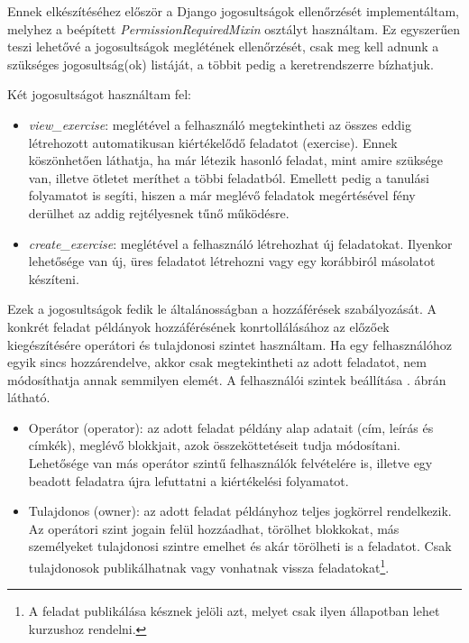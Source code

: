 Ennek elkészítéséhez először a Django jogosultságok ellenőrzését implementáltam, melyhez a beépített \textit{PermissionRequiredMixin} osztályt használtam. Ez egyszerűen teszi lehetővé a jogosultságok meglétének ellenőrzését, csak meg kell adnunk a szükséges jogosultság(ok) listáját, a többit pedig a keretrendszerre bízhatjuk. \cite{DjangoPermissionMixin}

Két jogosultságot használtam fel:

\begin{itemize}
    \item \textit{view\_exercise}: meglétével a felhasználó megtekintheti az összes eddig létrehozott automatikusan kiértékelődő feladatot (exercise). Ennek köszönhetően láthatja, ha már létezik hasonló feladat, mint amire szüksége van, illetve ötletet meríthet a többi feladatból. Emellett pedig a tanulási folyamatot is segíti, hiszen a már meglévő feladatok megértésével fény derülhet az addig rejtélyesnek tűnő működésre.
    \item \textit{create\_exercise}: meglétével a felhasználó létrehozhat új feladatokat. Ilyenkor lehetősége van új, üres feladatot létrehozni vagy egy korábbiról másolatot készíteni.
\end{itemize}

Ezek a jogosultságok fedik le általánosságban a hozzáférések szabályozását. A konkrét feladat példányok hozzáférésének konrtollálásához az előzőek kiegészítésére operátori és tulajdonosi szintet használtam. Ha egy felhasználóhoz egyik sincs hozzárendelve, akkor csak megtekintheti az adott feladatot, nem módosíthatja annak semmilyen elemét. A felhasználói szintek beállítása . ábrán látható.

\begin{itemize}
    \item Operátor (operator): az adott feladat példány alap adatait (cím, leírás és címkék), meglévő blokkjait, azok összeköttetéseit tudja módosítani. Lehetősége van más operátor szintű felhasználók felvételére is, illetve egy beadott feladatra újra lefuttatni a kiértékelési folyamatot.
    \item Tulajdonos (owner): az adott feladat példányhoz teljes jogkörrel rendelkezik. Az operátori szint jogain felül hozzáadhat, törölhet blokkokat, más személyeket tulajdonosi szintre emelhet és akár törölheti is a feladatot. Csak tulajdonosok publikálhatnak vagy vonhatnak vissza feladatokat\footnote{A feladat publikálása késznek jelöli azt, melyet csak ilyen állapotban lehet kurzushoz rendelni.}.
\end{itemize}

